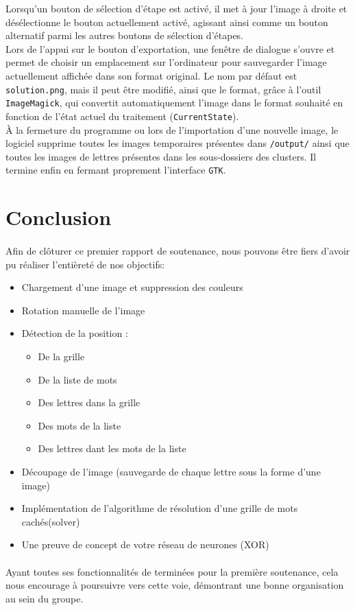 \documentclass{article}
\begin{document}
Lorsqu'un bouton de sélection d'étape est activé, il met à jour l'image à droite et désélectionne le bouton actuellement activé, agissant ainsi comme un bouton alternatif parmi les autres boutons de sélection d'étapes.\\

Lors de l'appui sur le bouton d'exportation, une fenêtre de dialogue s'ouvre et permet de choisir un emplacement sur l'ordinateur pour sauvegarder l'image actuellement affichée dans son format original. Le nom par défaut est \texttt{solution.png}, mais il peut être modifié, ainsi que le format, grâce à l'outil \texttt{ImageMagick}, qui convertit automatiquement l'image dans le format souhaité en fonction de l'état actuel du traitement (\texttt{CurrentState}).\\

À la fermeture du programme ou lors de l'importation d'une nouvelle image, le logiciel supprime toutes les images temporaires présentes dans \texttt{/output/} ainsi que toutes les images de lettres présentes dans les sous-dossiers des clusters. Il termine enfin en fermant proprement l'interface \texttt{GTK}.\\
\newpage
\section{Conclusion}
\paragraph{}
Afin de clôturer ce premier rapport de soutenance, nous pouvons être fiers d’avoir pu réaliser l’entièreté de nos objectifs:
\begin{itemize}
    \item Chargement d’une image et suppression des couleurs 
    \item Rotation manuelle de l’image 
    \item Détection de la position : 
    \begin{itemize}
        \item De la grille
        \item De la liste de mots
        \item Des lettres dans la grille
        \item Des mots de la liste
        \item Des lettres dant les mots de la liste
    \end{itemize}
    \item Découpage de l’image (sauvegarde de chaque lettre sous la forme d’une image)
    \item Implémentation de l’algorithme de résolution d’une grille de mots cachés(solver)
    \item Une preuve de concept de votre réseau de neurones (XOR)
\end{itemize}
\paragraph{}
Ayant toutes ses fonctionnalités de terminées pour la première soutenance, cela nous encourage à poursuivre vers cette voie, démontrant une bonne organisation au sein du groupe.
\end{document}
